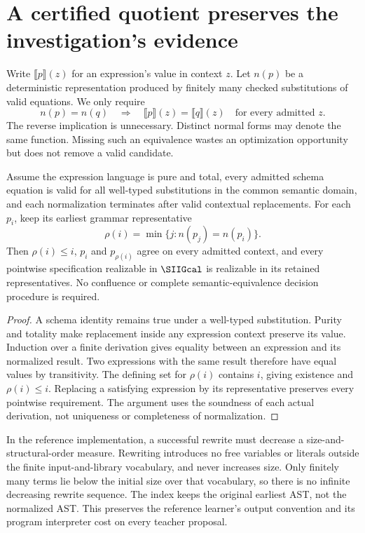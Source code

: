 \section{A certified quotient preserves the investigation's evidence}\label{SII:sec:ordered-quotient}
Write $\llbracket p\rrbracket(z)$ for an expression's value in context $z$. Let $n(p)$ be a deterministic representation produced by finitely many checked substitutions of valid equations. We only require
\[
 n(p)=n(q)\quad\Longrightarrow\quad
 \llbracket p\rrbracket(z)=\llbracket q\rrbracket(z)
 \quad\text{for every admitted }z.
\]
The reverse implication is unnecessary. Distinct normal forms may denote the same function. Missing such an equivalence wastes an optimization opportunity but does not remove a valid candidate.

\begin{SIItheorem}\label{SII:thm:certified-quotient}
Assume the expression language is pure and total, every admitted schema equation is valid for all well-typed substitutions in the common semantic domain, and each normalization terminates after valid contextual replacements. For each $p_i$, keep its earliest grammar representative
\[
 \rho(i)=\min\{j:n(p_j)=n(p_i)\}.
\]
Then $\rho(i)\le i$, $p_i$ and $p_{\rho(i)}$ agree on every admitted context, and every pointwise specification realizable in $\SIIGcal$ is realizable in its retained representatives. No confluence or complete semantic-equivalence decision procedure is required.
\end{SIItheorem}
\begin{proof}
A schema identity remains true under a well-typed substitution. Purity and totality make replacement inside any expression context preserve its value. Induction over a finite derivation gives equality between an expression and its normalized result. Two expressions with the same result therefore have equal values by transitivity. The defining set for $\rho(i)$ contains $i$, giving existence and $\rho(i)\le i$. Replacing a satisfying expression by its representative preserves every pointwise requirement. The argument uses the soundness of each actual derivation, not uniqueness or completeness of normalization.
\end{proof}

In the reference implementation, a successful rewrite must decrease a size-and-structural-order measure. Rewriting introduces no free variables or literals outside the finite input-and-library vocabulary, and never increases size. Only finitely many terms lie below the initial size over that vocabulary, so there is no infinite decreasing rewrite sequence. The index keeps the original earliest AST, not the normalized AST. This preserves the reference learner's output convention and its program interpreter cost on every teacher proposal.

